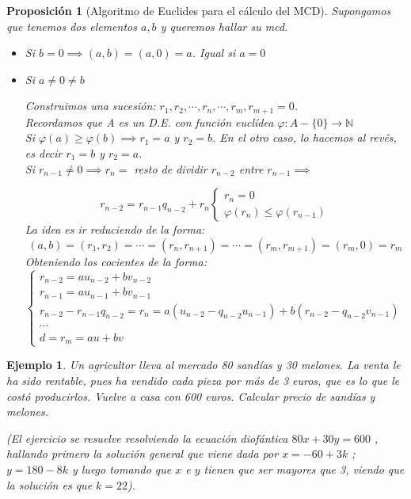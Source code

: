 \documentclass[11pt, a4paper, titlepage]{article}
\providecommand{\nat}{\mathbb{N}}
\theoremstyle{theorem-style}
\newtheorem*{nprop}{Proposición}
\theoremstyle{definition-style}
\theoremstyle{remark-style}
\theoremstyle{example-style}
\newtheorem*{ejemplo}{Ejemplo}
\begin{document}
\begin{nprop}[Algoritmo de Euclides para el cálculo del MCD]
Supongamos que tenemos dos elementos $a,b$ y queremos hallar su mcd.

\begin{itemize}
	
	\item Si $b=0 \implies (a,b) = (a,0) = a$. Igual si $a=0$
	
	\item Si $a \ne 0 \ne b$
	
	Construimos una sucesión: $r_1,r_2,\cdots, r_n, \cdots , r_m, r_{m+1} = 0$.\\
	Recordamos que A es un D.E. con función euclídea $\varphi : A-\{0\} \to \nat $\\
	Si $\varphi(a) \geq \varphi(b)\implies r_1 = a$ y $r_2 = b$. En el otro caso, lo hacemos al revés, es decir  $r_1 = b $ y $r_2 = a$.\\
	Si $r_{n-1} \ne 0 \implies r_n= $ resto de dividir $r_{n-2}$ entre $r_{n-1} \implies$
	
	\[
	r_{n-2} = r_{n-1}q_{n-2} + r_n \begin{cases}
	 r_n = 0 \\
	  \varphi(r_n) \leq \varphi(r_{n-1})
\end{cases}
	 \]
La idea es ir reduciendo de la forma:
\[ (a,b) = (r_1,r_2) = \cdots = (r_n,r_{n+1}) = \cdots = (r_m, r_{m+1}) = (r_m,0) = r_m\]
Obteniendo los cocientes de la forma:
\[\begin{cases}
	r_{n-2} = au_{n-2} + bv_{n-2}\\

r_{n-1} = au_{n-1} + bv_{n-1}\\

r_{n-2} - r_{n-1}q_{n-2} = r_n = a(u_{n-2} - q_{n-2}u_{n-1}) + b(r_{n-2}-q_{n-2}v_{n-1})\\
\cdots \\

d = r_m = au + bv
\end{cases}
\quad
\]
	
	\end{itemize}
\end{nprop}

\begin{ejemplo}
  Un agricultor lleva al mercado 80 sandías y 30 melones. La venta le ha sido rentable, pues ha vendido cada pieza por más de 3 euros, que es lo que le costó producirlos. Vuelve a casa con 600 euros. Calcular precio de sandías y melones.
  
	(El ejercicio se resuelve resolviendo la ecuación diofántica $80x +30y = 600$ , hallando primero la solución general que viene dada por $x = -60 + 3k$ ; $y = 180 - 8k$ y luego tomando que $x$ e $y$ tienen que ser mayores que 3, viendo que la solución es que $k=22$).
\end{ejemplo}
\end{document}

